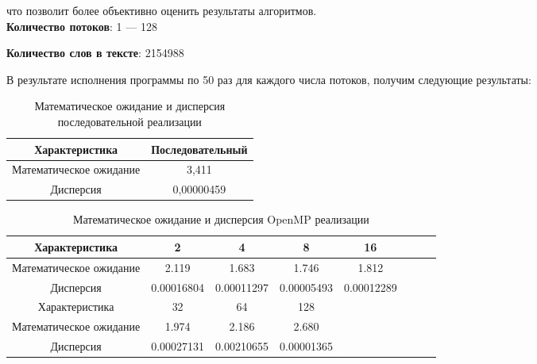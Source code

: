 что позволит более объективно оценить результаты алгоритмов.\\

\textbf{Количество потоков}: 1 --- 128

\textbf{Количество слов в тексте}: 2154988

В результате исполнения программы по 50 раз для каждого числа потоков, получим следующие результаты:

\begin{table}[H]
	\centering
	\begin{tabular}{|c|c|}
		\hline
		Характеристика          & Последовательный \\ \hline
		Математическое ожидание & 3,411            \\ \hline
		Дисперсия               & 0,00000459       \\
		\hline
	\end{tabular}
	\caption{Математическое ожидание и дисперсия последовательной реализации}
	\label{tab:stats}
\end{table}

\begin{table}[H]
	\centering
	\begin{tabular}{|c|c|c|c|c|c|c|c|}
		\hline
		Характеристика          & 2          & 4          & 8          & 16          \\ \hline
		Математическое ожидание & 2.119      & 1.683      & 1.746      & 1.812       \\ \hline
		Дисперсия               & 0.00016804 & 0.00011297 & 0.00005493 & 0.00012289  \\ \hline \hline
		Характеристика          & 32         & 64         & 128        &             \\ \hline
		Математическое ожидание & 1.974      & 2.186      & 2.680      &             \\ \hline
		Дисперсия               & 0.00027131 & 0.00210655 & 0.00001365 &             \\
		\hline
	\end{tabular}
	\caption{Математическое ожидание и дисперсия OpenMP реализации}
	\label{tab:stats}
\end{table}

